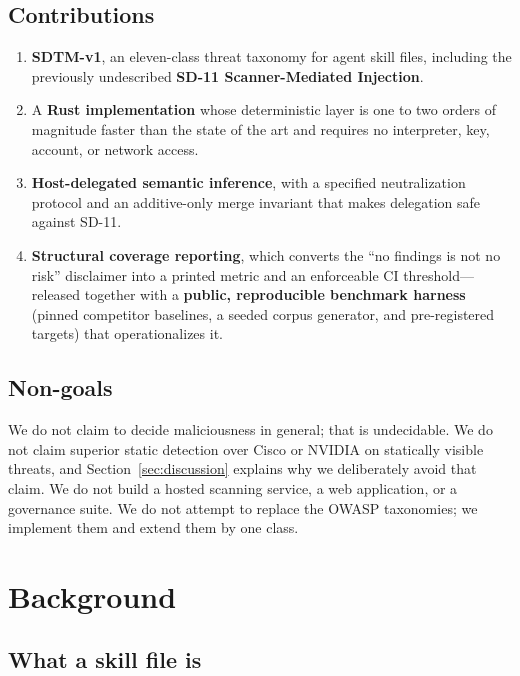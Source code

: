 \documentclass[11pt]{article}
\begin{document}
\subsection{Contributions}

\begin{enumerate}[leftmargin=*,itemsep=2pt]
  \item \textbf{SDTM-v1}, an eleven-class threat taxonomy for agent skill
  files, including the previously undescribed \textbf{SD-11 Scanner-Mediated
  Injection}.
  \item A \textbf{Rust implementation} whose deterministic layer is one to two
  orders of magnitude faster than the state of the art and requires no
  interpreter, key, account, or network access.
  \item \textbf{Host-delegated semantic inference}, with a specified
  neutralization protocol and an additive-only merge invariant that makes
  delegation safe against SD-11.
  \item \textbf{Structural coverage reporting}, which converts the ``no
  findings is not no risk'' disclaimer into a printed metric and an enforceable
  CI threshold---released together with a \textbf{public, reproducible benchmark
  harness} (pinned competitor baselines, a seeded corpus generator, and
  pre-registered targets) that operationalizes it.
\end{enumerate}

\subsection{Non-goals}

We do not claim to decide maliciousness in general; that is undecidable. We do
not claim superior static detection over Cisco or NVIDIA on statically visible
threats, and Section~\ref{sec:discussion} explains why we deliberately avoid
that claim. We do not build a hosted scanning service, a web application, or a
governance suite. We do not attempt to replace the OWASP taxonomies; we
implement them and extend them by one class.

\section{Background}

\subsection{What a skill file is}
\end{document}
